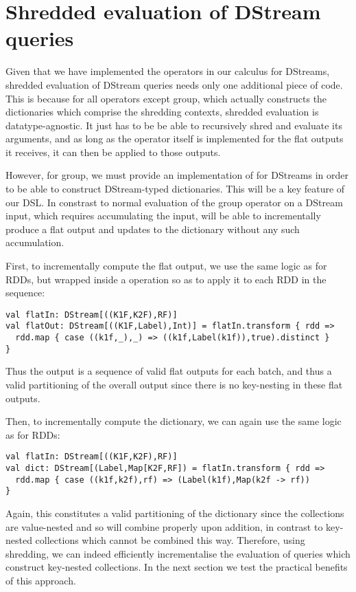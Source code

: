 \section{Shredded evaluation of DStream queries}
Given that we have implemented the operators in our calculus for DStreams, shredded evaluation of DStream queries needs only one additional piece of code. This is because for all operators except group, which actually constructs the dictionaries which comprise the shredding contexts, shredded evaluation is datatype-agnostic. It just has to be be able to recursively shred and evaluate its arguments, and as long as the operator itself is implemented for the flat outputs it receives, it can then be applied to those outputs.

However, for group, we must provide an implementation of  for DStreams in order to be able to construct DStream-typed dictionaries. This will be a key feature of our DSL. In constrast to normal evaluation of the group operator on a DStream input, which requires accumulating the input,  will be able to incrementally produce a flat output and updates to the dictionary without any such accumulation. 

First, to incrementally compute the flat output, we use the same logic as for RDDs, but wrapped inside a  operation so as to apply it to each RDD in the sequence:
\vs\begin{lstlisting}
val flatIn: DStream[((K1F,K2F),RF)]
val flatOut: DStream[((K1F,Label),Int)] = flatIn.transform { rdd =>
  rdd.map { case ((k1f,_),_) => ((k1f,Label(k1f)),true).distinct }
}
\end{lstlisting}\vs
Thus the output is a sequence of valid flat outputs for each batch, and thus a valid partitioning of the overall output since there is no key-nesting in these flat outputs.

\vs Then, to incrementally compute the dictionary, we can again use the same logic as for RDDs:
\vs\begin{lstlisting}
val flatIn: DStream[((K1F,K2F),RF)]
val dict: DStream[(Label,Map[K2F,RF]) = flatIn.transform { rdd =>
  rdd.map { case ((k1f,k2f),rf) => (Label(k1f),Map(k2f -> rf))
}
\end{lstlisting}\vs

Again, this constitutes a valid partitioning of the dictionary since the collections are value-nested and so will combine properly upon addition, in contrast to key-nested collections which cannot be combined this way.
Therefore, using shredding, we can indeed efficiently incrementalise the evaluation of queries which construct key-nested collections. In the next section we test the practical benefits of this approach.